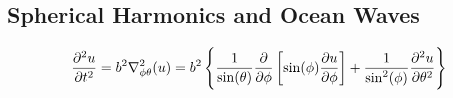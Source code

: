 \documentclass[class=report, 12pt, crop=false]{standalone}
\begin{document}
\begin{center}
\chapter{Spherical Harmonics and Ocean Waves}
\begin{comment}
Physics Archives
\end{comment}
$$\frac{\partial^2u}{\partial t^2} = b^2\nabla^2_{\phi\theta}(u) = b^2\left\{\frac{1}{\sin(\theta)}\frac{\partial}{\partial \phi}\left[\sin(\phi)\frac{\partial u}{\partial \phi}\right] + \frac{1}{\sin^2(\phi)}\frac{\partial^2u}{\partial \theta^2}\right\}$$
\end{center}
\end{document}
